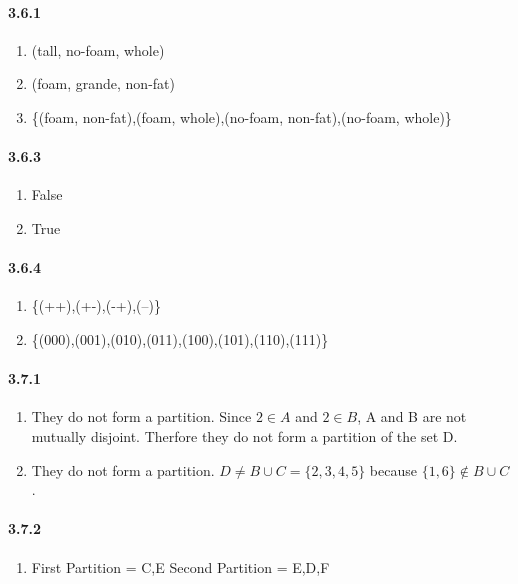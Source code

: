 \documentclass[11pt, letterpaper, twocolumn, fleqn]{article}
\begin{document}
    \paragraph{3.6.1}
    \renewcommand{\labelenumi}{\alph{enumi}.}
    \begin{enumerate}
        \item (tall, no-foam, whole)
        \item (foam, grande, non-fat)
        \item \{(foam, non-fat),(foam, whole),(no-foam, non-fat),(no-foam, whole)\}
    \end{enumerate}
    
    \paragraph{3.6.3}
    \renewcommand{\labelenumi}{\alph{enumi}.}
    \begin{enumerate}
        \item False
        \item True
    \end{enumerate}
    
    \paragraph{3.6.4}
    \renewcommand{\labelenumi}{\alph{enumi}.}
    \begin{enumerate}
        \item \{(++),(+-),(-+),(--)\} 
        \item \{(000),(001),(010),(011),(100),(101),(110),(111)\}
    \end{enumerate}
    
    \paragraph{3.7.1}
    \renewcommand{\labelenumi}{\alph{enumi}.}
    \begin{enumerate}
        \item They do not form a partition. Since $2 \in A$ and $2 \in B$, A and B are not mutually disjoint. Therfore they do not form a partition of the set D.
        \item They do not form a partition. $D \neq B \cup C = \{2,3,4,5\}$ because $\{1, 6\} \notin B \cup C$. 
    \end{enumerate}
    
    \paragraph{3.7.2}
    \renewcommand{\labelenumi}{\alph{enumi}.}
    \begin{enumerate}
        \item 
            First Partition = C,E \newline
            Second Partition = E,D,F
    \end{enumerate}
    
\end{document}
